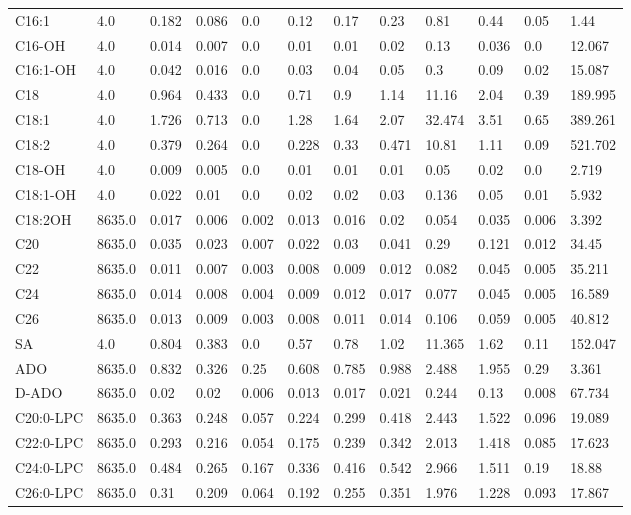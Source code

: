 \begin{tabular}{llllllllllll}
C16:1 & 4.0 & 0.182 & 0.086 & 0.0 & 0.12 & 0.17 & 0.23 & 0.81 & 0.44 & 0.05 & 1.44 \\
C16-OH & 4.0 & 0.014 & 0.007 & 0.0 & 0.01 & 0.01 & 0.02 & 0.13 & 0.036 & 0.0 & 12.067 \\
C16:1-OH & 4.0 & 0.042 & 0.016 & 0.0 & 0.03 & 0.04 & 0.05 & 0.3 & 0.09 & 0.02 & 15.087 \\
C18 & 4.0 & 0.964 & 0.433 & 0.0 & 0.71 & 0.9 & 1.14 & 11.16 & 2.04 & 0.39 & 189.995 \\
C18:1 & 4.0 & 1.726 & 0.713 & 0.0 & 1.28 & 1.64 & 2.07 & 32.474 & 3.51 & 0.65 & 389.261 \\
C18:2 & 4.0 & 0.379 & 0.264 & 0.0 & 0.228 & 0.33 & 0.471 & 10.81 & 1.11 & 0.09 & 521.702 \\
C18-OH & 4.0 & 0.009 & 0.005 & 0.0 & 0.01 & 0.01 & 0.01 & 0.05 & 0.02 & 0.0 & 2.719 \\
C18:1-OH & 4.0 & 0.022 & 0.01 & 0.0 & 0.02 & 0.02 & 0.03 & 0.136 & 0.05 & 0.01 & 5.932 \\
C18:2OH & 8635.0 & 0.017 & 0.006 & 0.002 & 0.013 & 0.016 & 0.02 & 0.054 & 0.035 & 0.006 & 3.392 \\
C20 & 8635.0 & 0.035 & 0.023 & 0.007 & 0.022 & 0.03 & 0.041 & 0.29 & 0.121 & 0.012 & 34.45 \\
C22 & 8635.0 & 0.011 & 0.007 & 0.003 & 0.008 & 0.009 & 0.012 & 0.082 & 0.045 & 0.005 & 35.211 \\
C24 & 8635.0 & 0.014 & 0.008 & 0.004 & 0.009 & 0.012 & 0.017 & 0.077 & 0.045 & 0.005 & 16.589 \\
C26 & 8635.0 & 0.013 & 0.009 & 0.003 & 0.008 & 0.011 & 0.014 & 0.106 & 0.059 & 0.005 & 40.812 \\
SA & 4.0 & 0.804 & 0.383 & 0.0 & 0.57 & 0.78 & 1.02 & 11.365 & 1.62 & 0.11 & 152.047 \\
ADO & 8635.0 & 0.832 & 0.326 & 0.25 & 0.608 & 0.785 & 0.988 & 2.488 & 1.955 & 0.29 & 3.361 \\
D-ADO & 8635.0 & 0.02 & 0.02 & 0.006 & 0.013 & 0.017 & 0.021 & 0.244 & 0.13 & 0.008 & 67.734 \\
C20:0-LPC & 8635.0 & 0.363 & 0.248 & 0.057 & 0.224 & 0.299 & 0.418 & 2.443 & 1.522 & 0.096 & 19.089 \\
C22:0-LPC & 8635.0 & 0.293 & 0.216 & 0.054 & 0.175 & 0.239 & 0.342 & 2.013 & 1.418 & 0.085 & 17.623 \\
C24:0-LPC & 8635.0 & 0.484 & 0.265 & 0.167 & 0.336 & 0.416 & 0.542 & 2.966 & 1.511 & 0.19 & 18.88 \\
C26:0-LPC & 8635.0 & 0.31 & 0.209 & 0.064 & 0.192 & 0.255 & 0.351 & 1.976 & 1.228 & 0.093 & 17.867 \\

\end{tabular}
